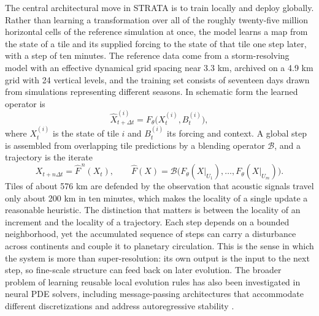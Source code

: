 \documentclass[11pt]{article}
\theoremstyle{definition}
\theoremstyle{remark}
\begin{document}
The central architectural move in STRATA \cite{hu2026strata} is to train locally and deploy globally. Rather than learning a transformation over all of the roughly twenty-five million horizontal cells of the reference simulation at once, the model learns a map from the state of a tile and its supplied forcing to the state of that tile one step later, with a step of ten minutes. The reference data come from a storm-resolving model with an effective dynamical grid spacing near 3.3 km, archived on a 4.9 km grid with 24 vertical levels, and the training set consists of seventeen days drawn from simulations representing different seasons. In schematic form the learned operator is
\begin{equation}
\widehat X^{(i)}_{t+\Delta t} = F_\theta\bigl(X^{(i)}_t, B^{(i)}_t\bigr),
\end{equation}
where $X^{(i)}_t$ is the state of tile $i$ and $B^{(i)}_t$ its forcing and context. A global step is assembled from overlapping tile predictions by a blending operator $\mathcal B$, and a trajectory is the iterate
\begin{equation}
X_{t+n\Delta t} = \widehat F^{\,n}(X_t), \qquad \widehat F(X) = \mathcal B\bigl(F_\theta(X|_{U_1}),\dots,F_\theta(X|_{U_m})\bigr).
\end{equation}
Tiles of about 576 km are defended by the observation that acoustic signals travel only about 200 km in ten minutes, which makes the locality of a single update a reasonable heuristic. The distinction that matters is between the locality of an increment and the locality of a trajectory. Each step depends on a bounded neighborhood, yet the accumulated sequence of steps can carry a disturbance across continents and couple it to planetary circulation. This is the sense in which the system is more than super-resolution: its own output is the input to the next step, so fine-scale structure can feed back on later evolution. The broader problem of learning reusable local evolution rules has also been investigated in neural PDE solvers, including message-passing architectures that accommodate different discretizations and address autoregressive stability \cite{brandstetter2022message}.
\end{document}
